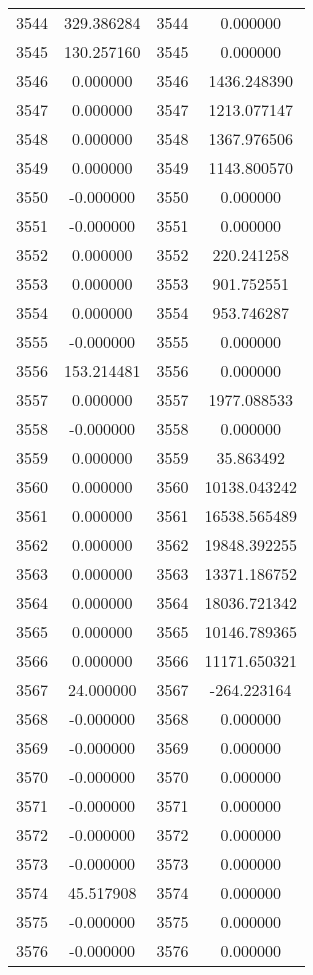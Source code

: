 \documentclass[12pt]{article}
\begin{document}
\begin{longtable}{@{}cccc@{}}
3544 & 329.386284 & 3544 & 0.000000 \\
3545 & 130.257160 & 3545 & 0.000000 \\
3546 & 0.000000 & 3546 & 1436.248390 \\
3547 & 0.000000 & 3547 & 1213.077147 \\
3548 & 0.000000 & 3548 & 1367.976506 \\
3549 & 0.000000 & 3549 & 1143.800570 \\
3550 & -0.000000 & 3550 & 0.000000 \\
3551 & -0.000000 & 3551 & 0.000000 \\
3552 & 0.000000 & 3552 & 220.241258 \\
3553 & 0.000000 & 3553 & 901.752551 \\
3554 & 0.000000 & 3554 & 953.746287 \\
3555 & -0.000000 & 3555 & 0.000000 \\
3556 & 153.214481 & 3556 & 0.000000 \\
3557 & 0.000000 & 3557 & 1977.088533 \\
3558 & -0.000000 & 3558 & 0.000000 \\
3559 & 0.000000 & 3559 & 35.863492 \\
3560 & 0.000000 & 3560 & 10138.043242 \\
3561 & 0.000000 & 3561 & 16538.565489 \\
3562 & 0.000000 & 3562 & 19848.392255 \\
3563 & 0.000000 & 3563 & 13371.186752 \\
3564 & 0.000000 & 3564 & 18036.721342 \\
3565 & 0.000000 & 3565 & 10146.789365 \\
3566 & 0.000000 & 3566 & 11171.650321 \\
3567 & 24.000000 & 3567 & -264.223164 \\
3568 & -0.000000 & 3568 & 0.000000 \\
3569 & -0.000000 & 3569 & 0.000000 \\
3570 & -0.000000 & 3570 & 0.000000 \\
3571 & -0.000000 & 3571 & 0.000000 \\
3572 & -0.000000 & 3572 & 0.000000 \\
3573 & -0.000000 & 3573 & 0.000000 \\
3574 & 45.517908 & 3574 & 0.000000 \\
3575 & -0.000000 & 3575 & 0.000000 \\
3576 & -0.000000 & 3576 & 0.000000 \\

\end{longtable}
\end{document}
